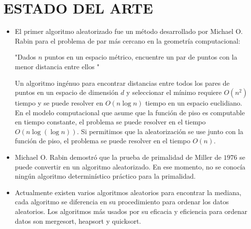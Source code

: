 \documentclass[a4 paper,12pt]{article}
\begin{document}
	\section*{ESTADO DEL ARTE}
	\begin{itemize}
		\item El primer algoritmo aleatorizado fue un método desarrollado por Michael O. Rabin para el problema de par más cercano en la geometría computacional:
		\begin{center}
			"Dados $n$ puntos en un espacio métrico, encuentre un par de puntos con la menor distancia entre ellos "
		\end{center}
		Un algoritmo ingénuo para encontrar distancias entre todos los pares de puntos en un espacio de dimensión $d$ y seleccionar el mínimo requiere $O(n^2)$ tiempo y se puede resolver en 
		$O(n\log n)$ tiempo en un espacio euclidiano. En el modelo computacional que asume que la función de piso es computable en tiempo constante, el problema se puede resolver en el tiempo $O(n\log(\log n) )$. Si permitimos que la aleatorización se use junto con la función de piso, el problema se puede resolver en el tiempo $O(n)$.
		\item Michael O. Rabin demostró que la prueba de primalidad de Miller de $1976$ se puede convertir en un algoritmo aleatorizado. En ese momento, no se conocía ningún algoritmo determinístico práctico para la primalidad.
		\item Actualmente existen varios algoritmos aleatorios para encontrar la mediana, cada algoritmo se diferencia en su procedimiento para ordenar los datos aleatorios. Los algoritmos más usados por su eficacia y eficiencia para ordenar datos son  mergesort,  heapsort y quicksort. 
	\end{itemize}
\end{document}
